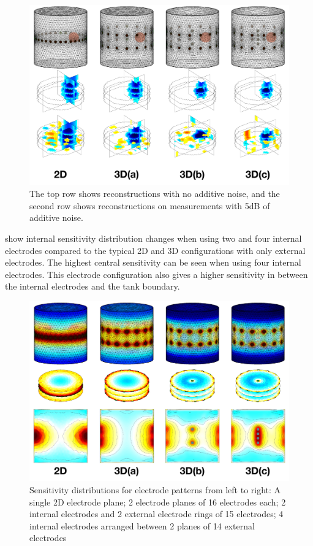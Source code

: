 \begin{figure}
\centering
\includegraphics[width=\textwidth]{chapter6-internal_electrodes/imgs/Image_Comparison.pdf}
\caption[Internal electrode simulation reconstructions]{The top row shows reconstructions with no additive noise, and the second row shows reconstructions on measurements with 5dB of
additive noise.}
\label{fig:reconstruction_comparison}
\end{figure}

 show internal sensitivity distribution changes when 
using two and four internal electrodes compared to the
typical 2D and 3D configurations with only external electrodes. 
The highest central sensitivity can be seen when using four internal 
electrodes. This electrode configuration also 
gives a higher sensitivity in between the internal electrodes
and the tank boundary.

\begin{figure}
\centering
\includegraphics[width=\textwidth]{chapter6-internal_electrodes/imgs/Sensitivity_Comparison_new.pdf}
\caption[Sensitivity with different internal electrode configurations]{Sensitivity distributions for electrode patterns from left to right: A single 2D electrode plane; 2 electrode planes of 16 electrodes 
each; 2 internal electrodes and 2 external electrode rings of 15 electrodes; 4 internal electrodes arranged between 2 planes of 14 external
electrodes}
\label{fig:internal_sensitivity}
\end{figure}

